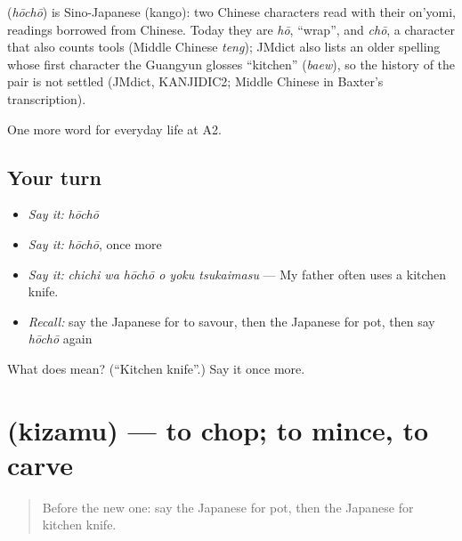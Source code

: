 \begin{cousinweb}
\textbf{} (\emph{hōchō}) is Sino-Japanese (kango): two Chinese characters read with their on'yomi, readings borrowed from Chinese. Today they are \emph{hō}, \textquotedblleft{}wrap\textquotedblright{}, and \emph{chō}, a character that also counts tools (Middle Chinese \emph{teng}); JMdict also lists an older spelling whose first character the Guangyun glosses \textquotedblleft{}kitchen\textquotedblright{} (\emph{baew}), so the history of the pair is not settled (JMdict, KANJIDIC2; Middle Chinese in Baxter's transcription).
\end{cousinweb}

\begin{grammarlens}[title={What you've built}]
One more word for everyday life at A2.
\end{grammarlens}

\subsection*{Your turn}
\begin{itemize}
\raggedright
  \item \emph{Say it:} \emph{hōchō}
  \item \emph{Say it:} \emph{hōchō}, once more
  \item \emph{Say it:} \emph{chichi wa hōchō o yoku tsukaimasu} — My father often uses a kitchen knife.
  \item \emph{Recall:} say the Japanese for to savour, then the Japanese for pot, then say \emph{hōchō} again
\end{itemize}

\begin{tcolorbox}[breakable,colback=teal!4,colframe=teal!35!black,title={Before you move on}]
What does  mean? (\textquotedblleft{}Kitchen knife\textquotedblright{}.) Say it once more.
\end{tcolorbox}
\section[\texorpdfstring{\ja{きざむ} (kizamu)}{きざむ (kizamu)}]{ (kizamu) — to chop; to mince, to carve}

\label{lesson:JA-C174-kizamu}



\begin{quote}
Before the new one: say the Japanese for pot, then the Japanese for kitchen knife.
\end{quote}

